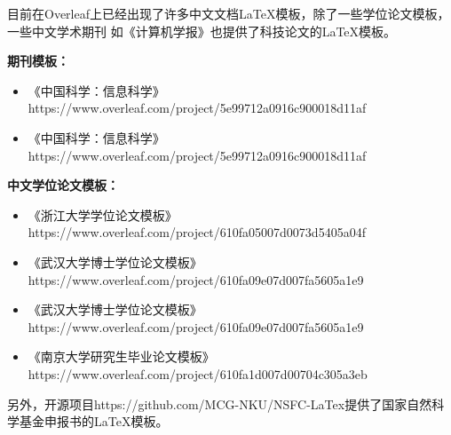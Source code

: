 目前在Overleaf上已经出现了许多中文文档LaTeX模板，除了一些学位论文模板，一些中文学术期刊
如《计算机学报》也提供了科技论文的LaTeX模板。

\textbf{期刊模板：}
\begin{itemize}
    \item 《中国科学：信息科学》https://www.overleaf.com/project/5e99712a0916c900018d11af
    \item 《中国科学：信息科学》https://www.overleaf.com/project/5e99712a0916c900018d11af
\end{itemize}

\textbf{中文学位论文模板：}
\begin{itemize}
    \item 《浙江大学学位论文模板》https://www.overleaf.com/project/610fa05007d0073d5405a04f
    \item 《武汉大学博士学位论文模板》https://www.overleaf.com/project/610fa09e07d007fa5605a1e9
    \item 《武汉大学博士学位论文模板》https://www.overleaf.com/project/610fa09e07d007fa5605a1e9
    \item 《南京大学研究生毕业论文模板》https://www.overleaf.com/project/610fa1d007d00704c305a3eb
\end{itemize}

另外，开源项目https://github.com/MCG-NKU/NSFC-LaTex提供了国家自然科学基金申报书的LaTeX模板。